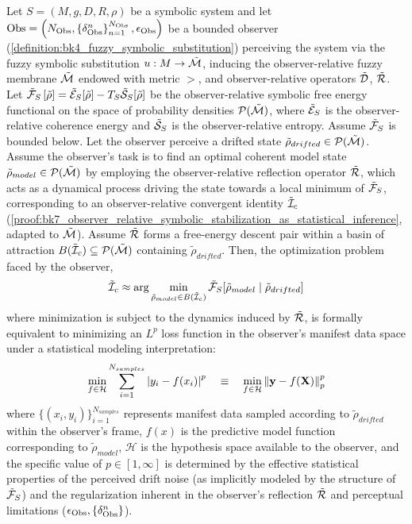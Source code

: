 \begin{theorem}
Let \( S = (M, g, D, R, \rho) \) be a symbolic system and let 
\( \mathrm{Obs} = \left(N_{\mathrm{Obs}}, \left\{ \delta^{n}_{\mathrm{Obs}} \right\}_{n=1}^{N_{\mathrm{Obs}}}, \epsilon_{\mathrm{Obs}} \right) \) 
be a bounded observer (\ref{definition:bk4_fuzzy_symbolic_substitution}) perceiving the system via the fuzzy symbolic substitution 
\( u : M \to \tilde{\mathcal{M}} \), inducing the observer-relative fuzzy membrane \( \tilde{\mathcal{M}} \) endowed with metric \( \gt \), and observer-relative operators \( \tilde{\mathcal{D}} \), \( \tilde{\mathcal{R}} \).
Let \( \tilde{\mathcal{F}}_S\left[ \tilde{\rho} \right] = \tilde{\mathcal{E}}_S[\tilde{\rho}] - T_S \tilde{\mathcal{S}}_S[\tilde{\rho}] \) be the observer-relative symbolic free energy functional on the space of probability densities \( \mathcal{P}(\tilde{\mathcal{M}}) \), where \( \tilde{\mathcal{E}}_S \) is the observer-relative coherence energy and \( \tilde{\mathcal{S}}_S \) is the observer-relative entropy. Assume \( \tilde{\mathcal{F}}_S \) is bounded below.
Let the observer perceive a drifted state \( \tilde{\rho}_{drifted} \in \mathcal{P}(\tilde{\mathcal{M}}) \). Assume the observer's task is to find an optimal coherent model state \( \tilde{\rho}_{model} \in \mathcal{P}(\tilde{\mathcal{M}}) \) by employing the observer-relative reflection operator \( \tilde{\mathcal{R}} \), which acts as a dynamical process driving the state towards a local minimum of \( \tilde{\mathcal{F}}_S \), corresponding to an observer-relative convergent identity \( \tilde{\mathcal{I}}_c \) (\ref{proof:bk7_observer_relative_symbolic_stabilization_as_statistical_inference}, adapted to \( \tilde{\mathcal{M}} \)). Assume \( \tilde{\mathcal{R}} \) forms a free-energy descent pair within a basin of attraction \( B(\tilde{\mathcal{I}}_c) \subseteq \mathcal{P}(\tilde{\mathcal{M}}) \) containing \( \tilde{\rho}_{drifted} \).
Then, the optimization problem faced by the observer,
\[
\tilde{\mathcal{I}}_c \approx \arg\min_{\tilde{\rho}_{model} \in B(\tilde{\mathcal{I}}_c)} \tilde{\mathcal{F}}_S[ \tilde{\rho}_{model} \mid \tilde{\rho}_{drifted} ]
\]
where minimization is subject to the dynamics induced by \( \tilde{\mathcal{R}} \), is formally equivalent to minimizing an \( L^p \) loss function in the observer's manifest data space under a statistical modeling interpretation:
\[
\min_{f \in \mathcal{H}} \sum_{i=1}^{N_{samples}} \left|y_i - f(x_i)\right|^p \quad \equiv \quad \min_{f \in \mathcal{H}} \left\|\mathbf{y} - f(\mathbf{X})\right\|_p^p
\]
where \( \{(x_i, y_i)\}_{i=1}^{N_{samples}} \) represents manifest data sampled according to \( \tilde{\rho}_{drifted} \) within the observer's frame, \( f(x) \) is the predictive model function corresponding to \( \tilde{\rho}_{model} \), \( \mathcal{H} \) is the hypothesis space available to the observer, and the specific value of \( p \in [1, \infty] \) is determined by the effective statistical properties of the perceived drift noise (as implicitly modeled by the structure of \( \tilde{\mathcal{F}}_S \)) and the regularization inherent in the observer's reflection \( \tilde{\mathcal{R}} \) and perceptual limitations (\( \epsilon_{\mathrm{Obs}}, \{\delta^n_{\mathrm{Obs}}\} \)).
\end{theorem}

